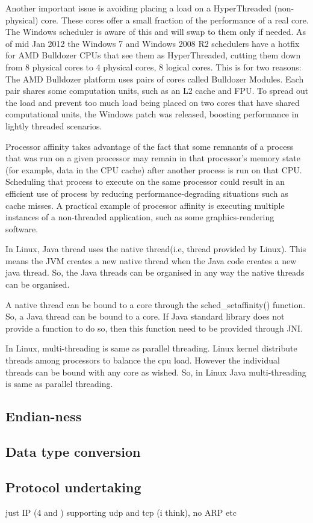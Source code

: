 \documentclass[final_report.tex]{subfiles}
\begin{document}
Another important issue is avoiding placing a load on a HyperThreaded (non-physical) core. These cores offer a small fraction of the performance of a real core. The Windows scheduler is aware of this and will swap to them only if needed. As of mid Jan 2012 the Windows 7 and Windows 2008 R2 schedulers have a hotfix for AMD Bulldozer CPUs that see them as HyperThreaded, cutting them down from 8 physical cores to 4 physical cores, 8 logical cores. This is for two reasons: The AMD Bulldozer platform uses pairs of cores called Bulldozer Modules. Each pair shares some computation units, such as an L2 cache and FPU. To spread out the load and prevent too much load being placed on two cores that have shared computational units, the Windows patch was released, boosting performance in lightly threaded scenarios.

Processor affinity takes advantage of the fact that some remnants of a process that was run on a given processor may remain in that processor's memory state (for example, data in the CPU cache) after another process is run on that CPU. Scheduling that process to execute on the same processor could result in an efficient use of process by reducing performance-degrading situations such as cache misses. A practical example of processor affinity is executing multiple instances of a non-threaded application, such as some graphics-rendering software.

In Linux, Java thread uses the native thread(i.e, thread provided by Linux).
This means the JVM creates a new native thread when the Java code creates a new java thread. So, the Java threads can be organised in any way the native threads can be organised.

A native thread can be bound to a core through the sched\_setaffinity() function. So, a Java thread can be bound to a core. If Java standard library does not provide a function to do so, then this function need to be provided through JNI.

In Linux, multi-threading is same as parallel threading. Linux kernel distribute threads among processors to balance the cpu load. However the individual threads can be bound with any core as wished. So, in Linux Java multi-threading is same as parallel threading.

\subsection{Endian-ness}

\subsection{Data type conversion}

\subsection{Protocol undertaking}
just IP (4 and ) supporting udp and tcp (i think), no ARP etc
\end{document}
